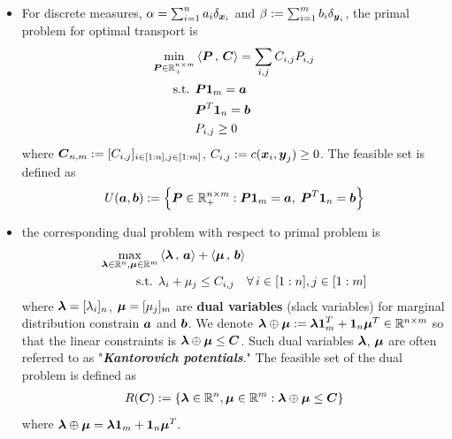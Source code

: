 \documentclass[11pt]{article}
\begin{document}
\begin{itemize}
\item For discrete measures, $\alpha = \sum_{i=1}^{n}a_i \delta_{\boldsymbol{x}_{i}}$ and $\beta := \sum_{i=1}^{m}b_i \delta_{\boldsymbol{y}_{i}}$, the primal problem for optimal transport is 
\begin{align}
\min_{\boldsymbol{P} \in {\mathbb R}_{+}^{n \times m}} & \left\langle \boldsymbol{P}\,,\, \boldsymbol{C} \right\rangle = \sum_{i,j}C_{i,j} P_{i,j} \label{eqn: optimal_transport_linear_prog}\\
\text{s.t. }&  \boldsymbol{P}\boldsymbol{1}_{m} = \boldsymbol{a} \label{eqn: optimal_transport_linear_constraint}\\
&\boldsymbol{P}^{T}\boldsymbol{1}_{n} = \boldsymbol{b}  \label{eqn: optimal_transport_linear_constraint2} \\
&P_{i,j} \ge 0 \nonumber
\end{align} where $\boldsymbol{C}_{n,m} := [C_{i,j}]_{i\in [1:n], j\in [1:m]}$,  $C_{i,j}:= c(\boldsymbol{x}_i, \boldsymbol{y}_j) \ge 0$. The feasible set is defined as
\begin{align}
U(\boldsymbol{a}, \boldsymbol{b}) := \left\{\boldsymbol{P} \in {\mathbb R}_{+}^{n \times m}: \boldsymbol{P}\boldsymbol{1}_{m} = \boldsymbol{a},\;\boldsymbol{P}^{T}\boldsymbol{1}_{n} = \boldsymbol{b}\right\} \label{eqn: optimal_transport_feasible_set}
\end{align}

\item the corresponding dual problem with respect to primal problem is 
\begin{align}
\max_{\boldsymbol{\lambda} \in {\mathbb R}^{n}, \boldsymbol{\mu} \in {\mathbb R}^{m}} & \left\langle \boldsymbol{\lambda}\,,\, \boldsymbol{a} \right\rangle + \left\langle \boldsymbol{\mu}\,,\, \boldsymbol{b} \right\rangle \label{eqn: optimal_transport_dual}\\
\text{s.t. } & \lambda_i + \mu_{j} \le C_{i,j}\quad \forall\, i\in [1:n], j\in [1:m] \label{eqn: optimal_transport_dual_constraint}
\end{align} where $\boldsymbol{\lambda}= [\lambda_i]_{n}$, $\boldsymbol{\mu}= [\mu_{j}]_{m}$ are \textbf{dual variables} (slack variables) for marginal distribution constrain $\boldsymbol{a}$ and $\boldsymbol{b}$. We denote $\boldsymbol{\lambda}\oplus \boldsymbol{\mu}:= \boldsymbol{\lambda}\boldsymbol{1}_{m}^{T} + \boldsymbol{1}_{n}\boldsymbol{\mu}^{T} \in {\mathbb R}^{n\times m}$ so that the linear constraints is $\boldsymbol{\lambda}\oplus \boldsymbol{\mu} \le \boldsymbol{C}$. Such dual variables $\boldsymbol{\lambda}$, $\boldsymbol{\mu}$ are often referred to as "\emph{\textbf{Kantorovich potentials}}."  The feasible set of the dual problem is defined as 
\begin{align}
R(\boldsymbol{C}) := \left\{\boldsymbol{\lambda} \in {\mathbb R}^{n}, \boldsymbol{\mu} \in {\mathbb R}^{m}: \boldsymbol{\lambda}\oplus \boldsymbol{\mu} \le \boldsymbol{C}\right\} \label{eqn: optimal_transport_dual_feasible_set}
\end{align} where $\boldsymbol{\lambda}\oplus \boldsymbol{\mu} = \boldsymbol{\lambda}\boldsymbol{1}_{m} + \boldsymbol{1}_n \boldsymbol{\mu}^{T}.$


\end{itemize}
\end{document}
